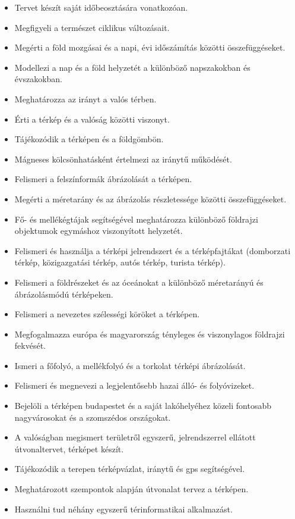 \begin{itemize}
\item
  Tervet készít saját időbeosztására vonatkozóan.
\item
  Megfigyeli a természet ciklikus változásait.
\item
  Megérti a föld mozgásai és a napi, évi időszámítás közötti
  összefüggéseket.
\item
  Modellezi a nap és a föld helyzetét a különböző napszakokban és
  évszakokban.
\item
  Meghatározza az irányt a valós térben.
\item
  Érti a térkép és a valóság közötti viszonyt.
\item
  Tájékozódik a térképen és a földgömbön.
\item
  Mágneses kölcsönhatásként értelmezi az iránytű működését.
\item
  Felismeri a felszínformák ábrázolását a térképen.
\item
  Megérti a méretarány és az ábrázolás részletessége közötti
  összefüggéseket.
\item
  Fő- és mellékégtájak segítségével meghatározza különböző földrajzi
  objektumok egymáshoz viszonyított helyzetét.
\item
  Felismeri és használja a térképi jelrendszert és a térképfajtákat
  (domborzati térkép, közigazgatási térkép, autós térkép, turista
  térkép).
\item
  Felismeri a földrészeket és az óceánokat a különböző méretarányú és
  ábrázolásmódú térképeken.
\item
  Felismeri a nevezetes szélességi köröket a térképen.
\item
  Megfogalmazza európa és magyarország tényleges és viszonylagos
  földrajzi fekvését.
\item
  Ismeri a főfolyó, a mellékfolyó és a torkolat térképi ábrázolását.
\item
  Felismeri és megnevezi a legjelentősebb hazai álló- és folyóvizeket.
\item
  Bejelöli a térképen budapestet és a saját lakóhelyéhez közeli
  fontosabb nagyvárosokat és a szomszédos országokat.
\item
  A valóságban megismert területről egyszerű, jelrendszerrel ellátott
  útvonaltervet, térképet készít.
\item
  Tájékozódik a terepen térképvázlat, iránytű és gps segítségével.
\item
  Meghatározott szempontok alapján útvonalat tervez a térképen.
\item
  Használni tud néhány egyszerű térinformatikai alkalmazást.

\end{itemize}
